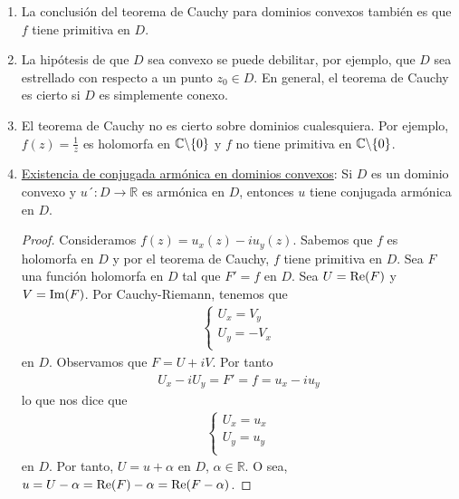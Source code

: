 \begin{obs}
    \begin{enumerate}
        \item La conclusión del teorema de Cauchy para dominios convexos también es que $f$ tiene primitiva en $D$.
        \item La hipótesis de que $D$ sea convexo se puede debilitar, por ejemplo, que $D$ sea estrellado con respecto a un punto $z_0 \in D$. En general, el teorema de Cauchy es cierto si $D$ es simplemente conexo.
        \item El teorema de Cauchy no es cierto sobre dominios cualesquiera. Por ejemplo, $f(z) = \frac{1}{z}$ es holomorfa en $\mathbb{C} \backslash \{0\}$ y $f$ no tiene primitiva en $\mathbb{C} \backslash \{0\}$.
        \item \underline{Existencia de conjugada armónica en dominios convexos}: Si $D$ es un dominio convexo y $u´: D \longrightarrow \mathbb{R}$ es armónica en $D$, entonces $u$ tiene conjugada armónica en $D$.
              \begin{proof}
                  Consideramos $f(z) = u_x(z) - iu_y(z)$. Sabemos que $f$ es holomorfa en $D$ y por el teorema de Cauchy, $f$ tiene primitiva en $D$. Sea $F$ una función holomorfa en $D$ tal que $F' = f$ en $D$. Sea $U = \text{Re}(F)$ y $V = \text{Im}(F)$. Por Cauchy-Riemann, tenemos que
                  \begin{align*}
                      \left\{ \begin{array}{lcc}
                                  U_x = V_y  \\
                                  U_y = -V_x \\
                              \end{array}
                      \right.
                  \end{align*}
                  en $D$. Observamos que $F = U + iV$. Por tanto
                  \begin{align*}
                      U_x - iU_y = F' = f = u_x - iu_y
                  \end{align*}
                  lo que nos dice que
                  \begin{align*}
                      \left\{ \begin{array}{lcc}
                                  U_x = u_x \\
                                  U_y = u_y \\
                              \end{array}
                      \right.
                  \end{align*}
                  en $D$. Por tanto, $U = u + \alpha$ en $D$, $\alpha \in \mathbb{R}$. O sea, $u = U - \alpha = \text{Re}(F) - \alpha = \text{Re}(F - \alpha)$.
              \end{proof}
    \end{enumerate}
\end{obs}

